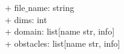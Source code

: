 {
+ file$\_$name: string \\
+ dims: int \\
+ domain: list[name str, info] \\ %
+ obstacles: list[name str, info] %
}
{
}
